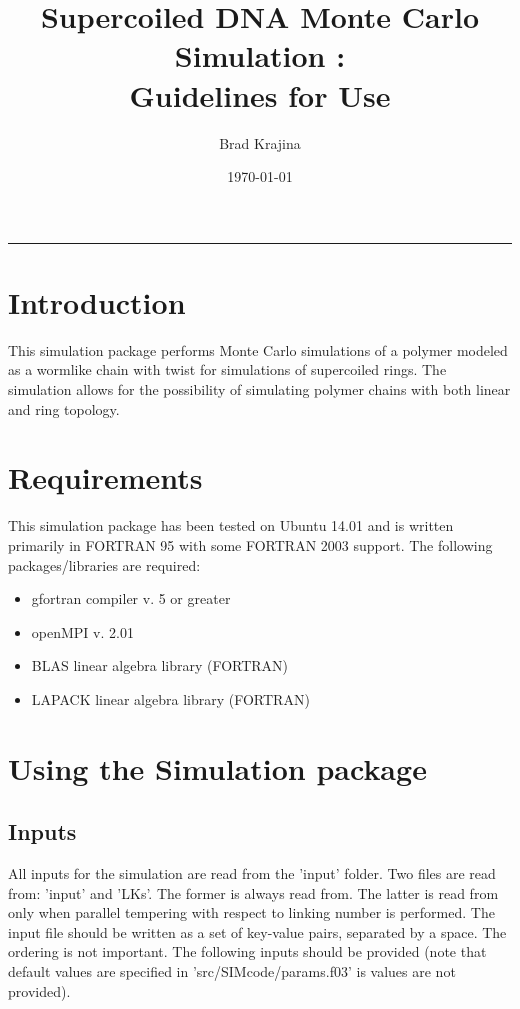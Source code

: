 \documentclass[english]{article}
\title{Supercoiled DNA Monte Carlo Simulation : \\Guidelines for Use}
\author{Brad Krajina}
\date{\today}
\begin{document}
\maketitle
\vspace{-0.2in}
\rule{\linewidth}{0.4pt}

\section{Introduction}
This simulation package performs Monte Carlo simulations of a polymer modeled as a wormlike chain with twist for simulations of supercoiled rings. The simulation allows for the possibility of simulating polymer chains with both linear and ring topology.
\section{Requirements}
This simulation package has been tested on Ubuntu 14.01 and is written primarily in FORTRAN 95 with some FORTRAN 2003 support. The following packages/libraries are required:
\begin{itemize}
\item gfortran compiler v. 5 or greater
\item openMPI v. 2.01 
\item BLAS linear algebra library (FORTRAN)
\item LAPACK linear algebra library (FORTRAN)
\end{itemize}

\section{Using the Simulation package}
\subsection{Inputs}
All inputs for the simulation are read from the 'input' folder. Two files are read from: 'input' and 'LKs'. The former is always read from. The latter is read from only when parallel tempering with respect to linking number is performed. The input file should be written as a set of key-value pairs, separated by a space. The ordering is not important. The following inputs should be provided (note that default values are specified in 'src/SIMcode/params.f03' is values are not provided).
\end{document}
